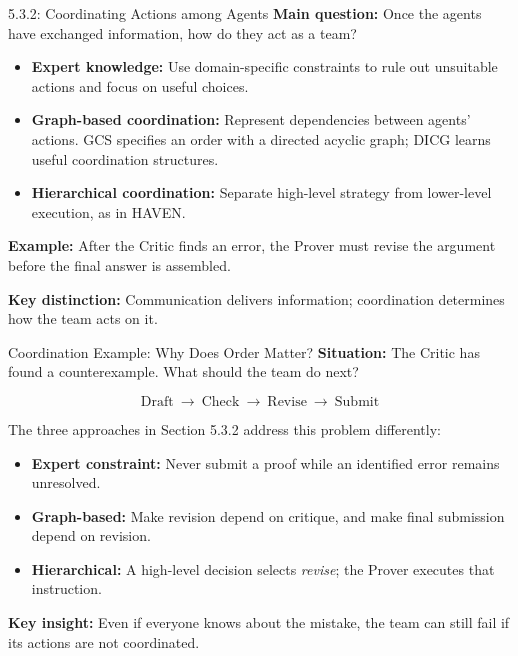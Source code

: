 \documentclass[aspectratio=169]{beamer}
\begin{document}
\begin{frame}{5.3.2: Coordinating Actions among Agents}
\small
\textbf{Main question:} Once the agents have exchanged information, how do they act as a team?

\vspace{0.2cm}
\begin{itemize}
    \item \textbf{Expert knowledge:}
    Use domain-specific constraints to rule out unsuitable actions and focus on useful choices.

    \vspace{0.15cm}
    \item \textbf{Graph-based coordination:}
    Represent dependencies between agents' actions. GCS specifies an order with a directed acyclic graph; DICG learns useful coordination structures.

    \vspace{0.15cm}
    \item \textbf{Hierarchical coordination:}
    Separate high-level strategy from lower-level execution, as in HAVEN.
\end{itemize}

\vspace{0.2cm}
\textbf{Example:} After the Critic finds an error, the Prover must revise the argument before the final answer is assembled.

\vspace{0.15cm}
\textbf{Key distinction:} Communication delivers information; coordination determines how the team acts on it.

\end{frame}

\begin{frame}{Coordination Example: Why Does Order Matter?}
\small
\textbf{Situation:} The Critic has found a counterexample. What should the team do next?

\[
\boxed{\text{Draft}}
\ \longrightarrow\ 
\boxed{\text{Check}}
\ \longrightarrow\ 
\boxed{\text{Revise}}
\ \longrightarrow\ 
\boxed{\text{Submit}}
\]

\vspace{0.1cm}
The three approaches in Section 5.3.2 address this problem differently:

\begin{itemize}
    \item \textbf{Expert constraint:} Never submit a proof while an identified error remains unresolved.
    \item \textbf{Graph-based:} Make revision depend on critique, and make final submission depend on revision.
    \item \textbf{Hierarchical:} A high-level decision selects \emph{revise}; the Prover executes that instruction.
\end{itemize}

\vspace{0.2cm}
\textbf{Key insight:} Even if everyone knows about the mistake, the team can still fail if its actions are not coordinated.

\end{frame}
\end{document}
